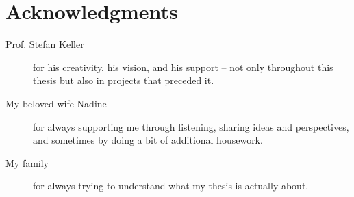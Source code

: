 
\chapter*{Acknowledgments}

\begin{description}
    \item[Prof. Stefan Keller] for his creativity, his vision, and his support – not only throughout this thesis but also in projects that preceded it.
    \item[My beloved wife Nadine] for always supporting me through listening, sharing ideas and perspectives, and sometimes by doing a bit of additional housework.
    \item[My family] for always trying to understand what my thesis is actually about.
\end{description}